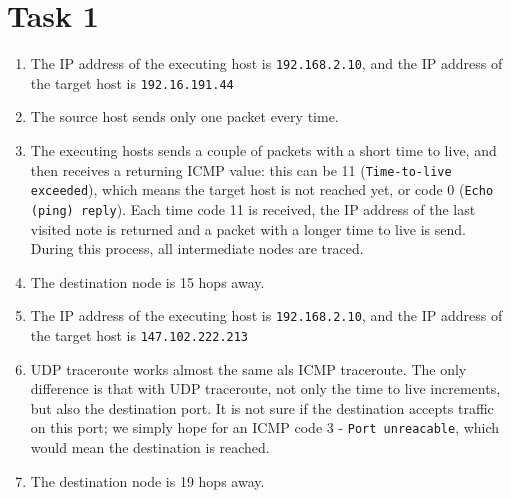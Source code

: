 \documentclass[12pt]{article}
\begin{document}
\maketitle
\section{Task 1}
\begin{enumerate}
	\item The IP address of the executing host is \verb|192.168.2.10|, and the IP address of the target host is \verb|192.16.191.44|
	\item The source host sends only one packet every time.
	\item The executing hosts sends a couple of packets with a short time to live, and then receives a returning ICMP value: this can be 11 (\verb|Time-to-live exceeded|), which means the target host is not reached yet, or code 0 (\verb|Echo (ping) reply|). Each time code 11 is received, the IP address of the last visited note is returned and a packet with a longer time to live is send. During this process, all intermediate nodes are traced.
	\item The destination node is 15 hops away.
	\item The IP address of the executing host is \verb|192.168.2.10|, and the IP address of the target host is \verb|147.102.222.213|
	\item UDP traceroute works almost the same als ICMP traceroute. The only difference is that with UDP traceroute, not only the time to live increments, but also the destination port. It is not sure if the destination accepts traffic on this port; we simply hope for an ICMP code 3 - \verb|Port unreacable|, which would mean the destination is reached.
	\item The destination node is 19 hops away.
\end{enumerate}
\end{document}
